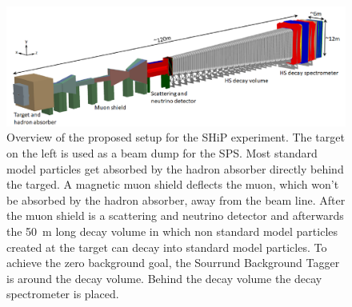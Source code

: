 \begin{figure}
	\centering
	\includegraphics[width=1.\textwidth]{pictures/ship_sketch}
	\caption[Overview of the SHiP experiment.]{Overview of the proposed setup for the SHiP experiment. The target on the left is used as a beam dump for the SPS. Most standard model particles get absorbed by the hadron absorber directly behind the targed. A magnetic muon shield deflects the muon, which won't be absorbed by the hadron absorber, away from the beam line. After the muon shield is a scattering and neutrino detector and afterwards the \SI{50}{\meter} long decay volume in which non standard model particles created at the target can decay into standard model particles. To achieve the zero background goal, the Sourrund Background Tagger is around the decay volume. Behind the decay volume the decay spectrometer is placed. \cite{ship_coll}}
	\label{fig:ship_sketch}
\end{figure}

